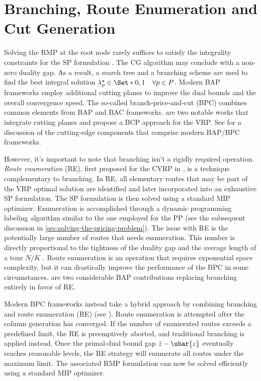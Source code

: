 \section{Branching, Route Enumeration and Cut Generation}
\label{sec:branching-and-cut-generation-within-bap-frameworks}

Solving the RMP at the root node rarely suffices to satisfy
the integrality constraints for the SP formulation
.
The CG algorithm may conclude with a non-zero duality gap.
As a result,
a search tree and a branching scheme are used to find
the best integral solution $\lambda^\star_p \in \Set*{0, 1} \quad \forall p \in P$.
Modern BAP frameworks employ additional cutting planes
to improve the dual bounds and the overall convergence speed.
The so-called branch-price-and-cut (BPC)
combines common elements from BAP and BAC frameworks.
\textcite{fukasawa2006, ropke2012} are two notable works that integrate
cutting planes and propose a BCP approach for the VRP.
See \textcite{sadykov2019modern} for a discussion of the cutting-edge components
that comprise modern BAP/BPC frameworks.

\medskip

However, it's important to note that branching isn't a rigidly required operation.
\textit{Route enumeration} (RE), first proposed for the CVRP in \textcite{baldacci2008},
is a technique complementary to branching.
In RE, all elementary routes that may be part of the VRP optimal solution are identified
and later incorporated into an exhaustive SP formulation.
The SP formulation is then solved using a standard MIP optimizer.
Enumeration is accomplished through a dynamic programming labeling algorithm similar
to the one employed for the PP (see the subsequent discussion in \cref{sec:solving-the-pricing-problem}).
The issue with RE is the potentially large number of routes that needs enumeration.
This number is directly proportional
to the tightness of the duality gap
and the average length of a tour $N / K$ \parencite{toth2014}.
Route enumeration is an operation that requires exponential space complexity,
but it can drastically improve the performance of the BPC in some circumstances.
\textcite{baldacci2008,baldacci2011} are two considerable BAP contributions
replacing branching entirely in favor of RE.

Modern BPC frameworks instead take a hybrid approach by combining branching and route enumeration (RE)
(see \cite{pessoa2008, pessoa2009,contardo2014,pecin2017improved,pecin2017new,pessoa2020}).
Route enumeration is attempted after the column generation has converged.
If the number of enumerated routes exceeds a predefined limit, the RE is preemptively aborted,
and traditional branching is applied instead.
Once the primal-dual bound gap  $\bar{z} - \ubar{z}$ eventually reaches reasonable levels,
the RE strategy will enumerate all routes under the maximum limit.
The associated RMP formulation can now be solved efficiently using a standard MIP optimizer.

